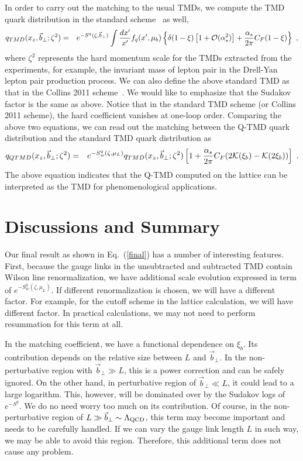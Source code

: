 \documentclass[aps,prd,preprint,tightenlines,superscriptaddress,nofootinbib]{revtex4}
\begin{document}
In order to carry out the matching to the usual TMDs, we compute the TMD quark distribution in the standard 
scheme~\cite{Collins,Catani:2000vq,Catani:2013tia,Prokudin:2015ysa} as well, 
\begin{eqnarray}
{q}_{TMD}(x_z,{\vec b}_\perp;\zeta^2)&=& e^{-{ {S}^q(\zeta,{\vec b}_\perp)}}\int\frac{dx'}{x'}f_q(x',\mu_b)\left\{
\delta(1-\xi)\left[1+{\cal O}(\alpha_s^2)\right]+\frac{\alpha_s}{2\pi}C_F(1-\xi)\right\}\ ,\nonumber\\
\end{eqnarray}
where $\zeta^2$ represents the hard momentum scale for the TMDs
extracted from the experiments, for example, the invariant mass of lepton
pair in the Drell-Yan lepton pair production process. We can also define
the above standard TMD as that in the Collins 2011 scheme~\cite{Collins}. 
We would like to emphasize that the Sudakov factor is the same as above. Notice that in the
standard TMD scheme (or Collins 2011 scheme), 
the hard coefficient vanishes at one-loop order. Comparing the above
two equations, we can read out the matching between the
Q-TMD quark distribution and the standard TMD quark distribution
as
\begin{eqnarray}
{q}_{QTMD}(x_z,{\vec b}_\perp;\zeta^2)&=&e^{-{ {S}_w^q(\zeta,\mu_L)}}{q}_{TMD}(x_z,{\vec b}_\perp;\zeta^2)\left[1+\frac{\alpha_s}{2\pi}C_F(2{\cal K}(\xi_b)-{\cal K}(2\xi_b))\right] \ . \label{final}
\end{eqnarray}
The above equation indicates that the Q-TMD computed on the lattice can be interpreted 
as the TMD for phenomenological applications. 


\section{Discussions and Summary}

Our final result as shown in Eq.~(\ref{final}) has a number of 
interesting features. First, because the gauge links in the unsubtracted
and subtracted TMD contain Wilson line renormalization, we have
additional scale evolution expressed in term of $e^{-{ {S}_w^q(\zeta,\mu_L)}}$.
If different renormalization is chosen, we will have a different factor. For
example, for the cutoff scheme in the lattice calculation, we will have different 
factor. In practical calculations, we may not need to perform resummation
for this term at all.

In the matching coefficient, we have a  functional dependence on
$\xi_b$. Its contribution depends on the relative size between $L$ and ${\vec b}_\perp$.
In the non-perturbative region with ${\vec b}_\perp\gg L$, this is a power correction and
can be safely ignored. On the other hand, in perturbative region of ${\vec b}_\perp\ll L$, it could lead to a large
logarithm. This, however, will be dominated over by the Sudakov logs of $e^{-S^q}$.
We do no need worry too much on its contribution.
Of course, in the non-perturbative region of $L\gg {\vec b}_\perp\sim \Lambda_{\rm QCD}$,
this term may become important and needs to be carefully handled. If we can vary 
the gauge link length $L$ in such way, we may be able to avoid this region. Therefore,
this additional term does not cause any problem. 
\end{document}
